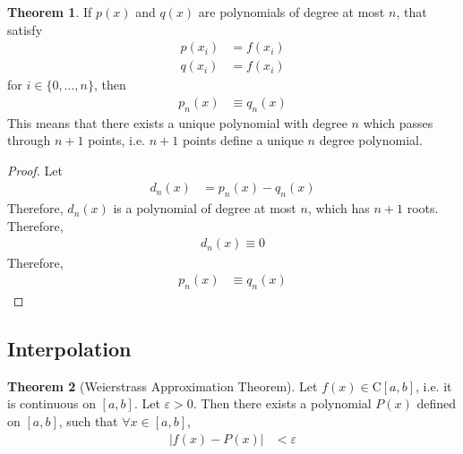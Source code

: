 \documentclass[fleqn, a4paper, 12pt, twoside]{article}
\theoremstyle{definition}
\theoremstyle{theorem}
\newtheorem{theorem}{Theorem}
\begin{document}
\begin{theorem}
	If $p(x)$ and $q(x)$ are polynomials of degree at most $n$, that satisfy
	\begin{align*}
		p(x_i) &= f(x_i)\\
		q(x_i) &= f(x_i)
	\end{align*}
	for $i \in \{0,\dots,n\}$, then
	\begin{align*}
		p_n(x) &\equiv q_n(x)
	\end{align*}
	This means that there exists a unique polynomial with degree $n$ which passes through $n + 1$ points, i.e. $n + 1$ points define a unique $n$ degree polynomial.
\end{theorem}

\begin{proof}
	Let
	\begin{align*}
		d_n(x) &= p_n(x) - q_n(x)
	\end{align*}
	Therefore, $d_n(x)$ is a polynomial of degree at most $n$, which has $n + 1$ roots.
	Therefore,
	\begin{align*}
		d_n(x) \equiv 0
	\end{align*}
	Therefore,
	\begin{align*}
		p_n(x) &\equiv q_n(x)
	\end{align*}
\end{proof}

\subsection{Interpolation}

\begin{theorem}[Weierstrass Approximation Theorem]
	Let $f(x) \in \mathrm{C} [a,b]$, i.e. it is continuous on $[a,b]$.
	Let $\varepsilon > 0$.
	Then there exists a polynomial $P(x)$ defined on $[a,b]$, such that $\forall x \in [a,b]$,
	\begin{align*}
		\left| f(x) - P(x) \right| &< \varepsilon
	\end{align*}
	\label{Weierstrass_Approximation_Theorem}
\end{theorem}
\end{document}
